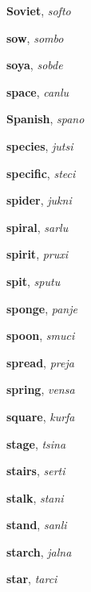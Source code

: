 \documentclass[12pt]{book}
\begin{document}
\begin{description}
\item[ ] \textbf{Soviet}, \textit{softo}

\item[ ] \textbf{sow}, \textit{sombo}

\item[ ] \textbf{soya}, \textit{sobde}

\item[ ] \textbf{space}, \textit{canlu}

\item[ ] \textbf{Spanish}, \textit{spano}

\item[ ] \textbf{species}, \textit{jutsi}

\item[ ] \textbf{specific}, \textit{steci}

\item[ ] \textbf{spider}, \textit{jukni}

\item[ ] \textbf{spiral}, \textit{sarlu}

\item[ ] \textbf{spirit}, \textit{pruxi}

\item[ ] \textbf{spit}, \textit{sputu}

\item[ ] \textbf{sponge}, \textit{panje}

\item[ ] \textbf{spoon}, \textit{smuci}

\item[ ] \textbf{spread}, \textit{preja}

\item[ ] \textbf{spring}, \textit{vensa}

\item[ ] \textbf{square}, \textit{kurfa}

\item[ ] \textbf{stage}, \textit{tsina}

\item[ ] \textbf{stairs}, \textit{serti}

\item[ ] \textbf{stalk}, \textit{stani}

\item[ ] \textbf{stand}, \textit{sanli}

\item[ ] \textbf{starch}, \textit{jalna}

\item[ ] \textbf{star}, \textit{tarci}


\end{description}
\end{document}
